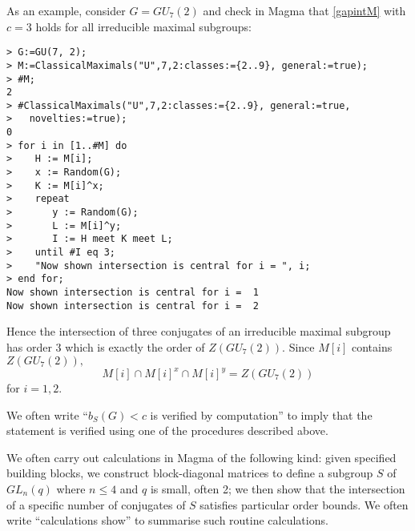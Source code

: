As an example, consider $G=GU_7(2)$ and check in  {\sc Magma} that \eqref{gapintM} with $c=3$ holds for all irreducible maximal subgroups:
{\small
\begin{lstlisting}
> G:=GU(7, 2);
> M:=ClassicalMaximals("U",7,2:classes:={2..9}, general:=true);
> #M;
2
> #ClassicalMaximals("U",7,2:classes:={2..9}, general:=true,
>   novelties:=true);
0
> for i in [1..#M] do
>    H := M[i];
>    x := Random(G);
>    K := M[i]^x;
>    repeat
>       y := Random(G);
>       L := M[i]^y;
>       I := H meet K meet L;
>    until #I eq 3;
>    "Now shown intersection is central for i = ", i;
> end for;
Now shown intersection is central for i =  1
Now shown intersection is central for i =  2 
\end{lstlisting}}

Hence the intersection of three conjugates of an irreducible  maximal subgroup has order $3$ which is exactly the order of $Z(GU_7(2)).$ Since $M[i]$ contains $Z(GU_7(2)),$ 
$$M[i] \cap M[i]^x \cap M[i]^y =Z(GU_7(2))$$
for $i=1,2.$

We often write ``$b_S(G)<c$ is verified by computation'' to imply that the statement is verified using one of the procedures described above.   

We often carry out calculations in {\sc Magma} of the following kind: given specified building blocks, we construct block-diagonal matrices to define a subgroup $S$ of $GL_n(q)$ where $n \le 4$ and $q$ is small, often 2; we then show  that the intersection of a specific number of conjugates of $S$ satisfies particular order bounds.  We often write ``calculations show'' to summarise such routine calculations.


